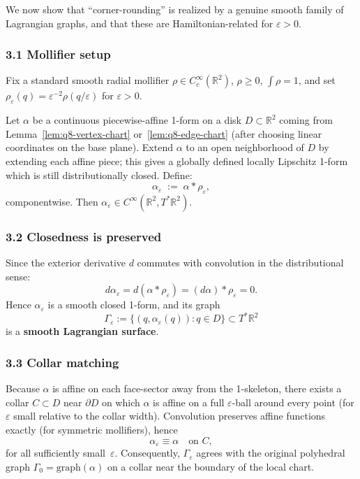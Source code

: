 We now show that ``corner-rounding'' is realized by a genuine smooth family of Lagrangian
graphs, and that these are Hamiltonian-related for $\varepsilon>0$.

\subsubsection*{3.1 Mollifier setup}
Fix a standard smooth radial mollifier $\rho\in C_c^\infty(\mathbb R^2)$,
$\rho\ge0$, $\int\rho=1$, and set
$\rho_\varepsilon(q)=\varepsilon^{-2}\rho(q/\varepsilon)$ for $\varepsilon>0$.

Let $\alpha$ be a continuous piecewise-affine 1-form on a disk $D\subset\mathbb R^2$
coming from Lemma~\ref{lem:q8-vertex-chart} or~\ref{lem:q8-edge-chart}
(after choosing linear coordinates on the base plane).
Extend $\alpha$ to an open neighborhood of $D$ by extending each affine piece;
this gives a globally defined locally Lipschitz 1-form which is still distributionally closed.
Define:
\[
\alpha_\varepsilon \;:=\; \alpha\ast\rho_\varepsilon,
\]
componentwise.  Then $\alpha_\varepsilon\in C^\infty(\mathbb R^2,T^*\mathbb R^2)$.

\subsubsection*{3.2 Closedness is preserved}
Since the exterior derivative $d$ commutes with convolution in the distributional sense:
\begin{equation}\label{eq:q8-closedness}
d\alpha_\varepsilon = d(\alpha\ast\rho_\varepsilon) = (d\alpha)\ast\rho_\varepsilon = 0.
\end{equation}
Hence $\alpha_\varepsilon$ is a smooth closed 1-form, and its graph
\[
\Gamma_\varepsilon := \{(q,\alpha_\varepsilon(q)):q\in D\}\subset T^*\mathbb R^2
\]
is a \textbf{smooth Lagrangian surface}.

\subsubsection*{3.3 Collar matching}
Because $\alpha$ is affine on each face-sector away from the 1-skeleton,
there exists a collar $C\subset D$ near $\partial D$ on which $\alpha$ is affine on a full
$\varepsilon$-ball around every point (for $\varepsilon$ small relative to the collar width).
Convolution preserves affine functions exactly (for symmetric mollifiers),
hence
\[
\alpha_\varepsilon \equiv \alpha\quad\text{on }C,
\]
for all sufficiently small~$\varepsilon$.
Consequently, $\Gamma_\varepsilon$ agrees with the original polyhedral graph
$\Gamma_0=\mathrm{graph}(\alpha)$ on a collar near the boundary of the local chart.

